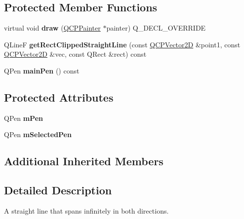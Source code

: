 \subsection*{Protected Member Functions}
\begin{DoxyCompactItemize}
\item 
virtual void {\bfseries draw} (\hyperlink{classQCPPainter}{Q\+C\+P\+Painter} $\ast$painter) Q\+\_\+\+D\+E\+C\+L\+\_\+\+O\+V\+E\+R\+R\+I\+DE\hypertarget{classQCPItemStraightLine_acbc84ad219bf4845152e4e2202fcaa3c}{}\label{classQCPItemStraightLine_acbc84ad219bf4845152e4e2202fcaa3c}

\item 
Q\+LineF {\bfseries get\+Rect\+Clipped\+Straight\+Line} (const \hyperlink{classQCPVector2D}{Q\+C\+P\+Vector2D} \&point1, const \hyperlink{classQCPVector2D}{Q\+C\+P\+Vector2D} \&vec, const Q\+Rect \&rect) const \hypertarget{classQCPItemStraightLine_a071f5b981adc2b9de103fb691001e317}{}\label{classQCPItemStraightLine_a071f5b981adc2b9de103fb691001e317}

\item 
Q\+Pen {\bfseries main\+Pen} () const \hypertarget{classQCPItemStraightLine_a63ef39814c5b560dbb7b13e3fec1d940}{}\label{classQCPItemStraightLine_a63ef39814c5b560dbb7b13e3fec1d940}

\end{DoxyCompactItemize}
\subsection*{Protected Attributes}
\begin{DoxyCompactItemize}
\item 
Q\+Pen {\bfseries m\+Pen}\hypertarget{classQCPItemStraightLine_a15106ddc2ebd73ed5c1bc57aa92bee8f}{}\label{classQCPItemStraightLine_a15106ddc2ebd73ed5c1bc57aa92bee8f}

\item 
Q\+Pen {\bfseries m\+Selected\+Pen}\hypertarget{classQCPItemStraightLine_a0307a0d56a018656adbf798bc84c2a4b}{}\label{classQCPItemStraightLine_a0307a0d56a018656adbf798bc84c2a4b}

\end{DoxyCompactItemize}
\subsection*{Additional Inherited Members}


\subsection{Detailed Description}
A straight line that spans infinitely in both directions. 

